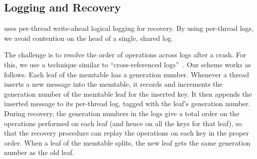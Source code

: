 \subsection{Logging and Recovery}
\label{sec:recovery}

\sysname uses per-thread write-ahead logical logging for recovery.  By
using per-thread logs, we avoid contention on the head of a single,
shared log.

The challenge is to resolve the order of operations across logs after
a crash.  For this, we use a technique similar to ``cross-referenced
logs''~\cite{!huang:cross:referencing:logs}.  Our scheme works as
follows.  Each leaf of the memtable has a generation number.  Whenever
a thread inserts a new message into the memtable, it records and
increments the generation number of the memtable leaf for the inserted
key.  It then appends the inserted message to its per-thread log,
tagged with the leaf's generation number.  During recovery, the
generation numbers in the logs give a total order on the operations
performed on each leaf (and hence on all the keys for that leaf), so
that the recovery procedure can replay the operations on each key in
the proper order.  When a leaf of the memtable splits, the new leaf
gets the same generation number as the old leaf.



